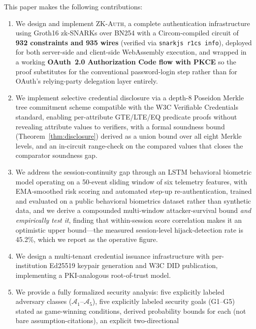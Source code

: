 \documentclass[journal,twoside,10pt]{IEEEtran}
\begin{document}
This paper makes the following contributions:
\begin{enumerate}
  \item We design and implement \textsc{ZK-Auth}, a complete authentication
        infrastructure using Groth16 zk-SNARKs over BN254 with a
        Circom-compiled circuit of \textbf{932 constraints and 935 wires}
        (verified via \texttt{snarkjs r1cs info}), deployed for both
        server-side and client-side WebAssembly execution, and wrapped in
        a working \textbf{OAuth~2.0 Authorization Code flow with PKCE}
        so the proof substitutes for the conventional password-login step
        rather than for OAuth's relying-party delegation layer entirely.
  \item We implement selective credential disclosure via a depth-8 Poseidon
        Merkle tree commitment scheme compatible with the W3C Verifiable
        Credentials standard, enabling per-attribute GTE/LTE/EQ predicate
        proofs without revealing attribute values to verifiers, with a
        formal soundness bound (Theorem~\ref{thm:disclosure}) derived as a
        union bound over all eight Merkle levels, and an in-circuit
        range-check on the compared values that closes the comparator
        soundness gap.
  \item We address the session-continuity gap through an LSTM behavioral
        biometric model operating on a 50-event sliding window of six
        telemetry features, with EMA-smoothed risk scoring and automated
        step-up re-authentication, trained and evaluated on a public
        behavioral biometrics dataset rather than synthetic data, and we
        derive a compounded multi-window attacker-survival bound \emph{and
        empirically test it}, finding that within-session score correlation
        makes it an optimistic upper bound---the measured session-level
        hijack-detection rate is 45.2\%, which we report as the operative
        figure.
  \item We design a multi-tenant credential issuance infrastructure with
        per-institution Ed25519 keypair generation and W3C DID publication,
        implementing a PKI-analogous root-of-trust model.
  \item We provide a fully formalized security analysis: five explicitly
        labeled adversary classes ($\mathcal{A}_1$--$\mathcal{A}_5$), five
        explicitly labeled security goals (G1--G5) stated as game-winning
        conditions, derived probability bounds for each (not bare
        assumption-citations), an explicit two-directional

\end{enumerate}
\end{document}
